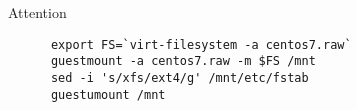 \documentclass[openany,twoside]{book}
\begin{document}
\begin{attention}{Attention}
  \begin{mdframed}[topline=false, bottomline=false, leftline=false, rightline=false, backgroundcolor=lbcolor]
    \begin{verbatim}
      export FS=`virt-filesystem -a centos7.raw`
      guestmount -a centos7.raw -m $FS /mnt
      sed -i 's/xfs/ext4/g' /mnt/etc/fstab
      guestumount /mnt
    \end{verbatim}
  \end{mdframed}
\end{attention}
\end{document}
